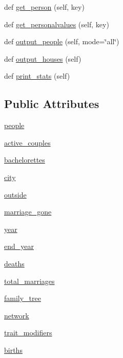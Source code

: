 \begin{DoxyCompactItemize}
def \hyperlink{classhistory_1_1History_a3f90436975aa6dbdd11075f094d8793d}{get\+\_\+person} (self, key)
\item 
def \hyperlink{classhistory_1_1History_a285a3d0d74548e6fe190012d92fa112b}{get\+\_\+personalvalues} (self, key)
\item 
def \hyperlink{classhistory_1_1History_afd1b49d25ff3d335f16c319082bd1ce7}{output\+\_\+people} (self, mode=\char`\"{}all\char`\"{})
\item 
def \hyperlink{classhistory_1_1History_a7ebe7444a2923f8b2794e5969d015527}{output\+\_\+houses} (self)
\item 
def \hyperlink{classhistory_1_1History_a7031f26ba762c682ce60294ff5eea78b}{print\+\_\+stats} (self)
\end{DoxyCompactItemize}
\subsection*{Public Attributes}
\begin{DoxyCompactItemize}
\item 
\hyperlink{classhistory_1_1History_ad2f8c1a1186563676591659e13976bdb}{people}
\item 
\hyperlink{classhistory_1_1History_a6af4cc7840a5c0207cd9adf6364c5e3d}{active\+\_\+couples}
\item 
\hyperlink{classhistory_1_1History_aaf640a37e38282917878d99506e1fea9}{bachelorettes}
\item 
\hyperlink{classhistory_1_1History_af83dc5a5b914adff69395bb3da8d1d48}{city}
\item 
\hyperlink{classhistory_1_1History_a3e54a0aef20f69923a0d93b013d7d801}{outside}
\item 
\hyperlink{classhistory_1_1History_ad81e18e4d0e79b519b2ba30428d1da6a}{marriage\+\_\+gone}
\item 
\hyperlink{classhistory_1_1History_ad6c676cb681045574a4ed4cfd53d298f}{year}
\item 
\hyperlink{classhistory_1_1History_a570c5cd1423bab2d6b447fa0c3570f9c}{end\+\_\+year}
\item 
\hyperlink{classhistory_1_1History_adfaa5efc039ca3d62758ee5777465ae8}{deaths}
\item 
\hyperlink{classhistory_1_1History_a56ae62ae790e7bfa1600dca2204395c8}{total\+\_\+marriages}
\item 
\hyperlink{classhistory_1_1History_a4c781d1d5861495bf5ff00fbad8d281a}{family\+\_\+tree}
\item 
\hyperlink{classhistory_1_1History_a6b0e481cf204b73d5ff152d72f588eb2}{network}
\item 
\hyperlink{classhistory_1_1History_a3bc52fc9a11337fdbf2f16f2d2d552d3}{trait\+\_\+modifiers}
\item 
\hyperlink{classhistory_1_1History_a5f17ba723813b53f8a3f5d6c7382b945}{births}
\end{DoxyCompactItemize}



